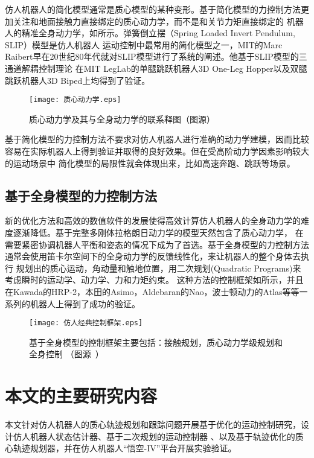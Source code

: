 仿人机器人的简化模型通常是质心模型的某种变形。基于简化模型的力控制方法更加关注和地面接触力直接绑定的质心动力学，而不是和关节力矩直接绑定的
机器人的精准全身动力学\cite{vukobratovic1972contribution}，如所示。弹簧倒立摆（Spring Loaded Invert Pendulum, SLIP）模型是仿人机器人
运动控制中最常用的简化模型之一，MIT的Marc Raibert早在20世纪80年代就对SLIP模型进行了系统的阐述\cite{raibert1986legged}。他基于SLIP模型的三通道解耦控制理论
在MIT LegLab的单腿跳跃机器人3D One-Leg Hopper以及双腿跳跃机器人3D Biped上均得到了验证。

\begin{figure}[htbp]
    \centering
    \texttt{[image: 质心动力学.eps]}
    \caption{\label{fig:centroid}质心动力学及其与全身动力学的联系释图（图源\cite{carpentier2016center}）}
\end{figure}
基于简化模型的力控制方法不要求对仿人机器人进行准确的动力学建模，因而比较容易在实际机器人上得到验证并取得的良好效果。但在受高阶动力学因素影响较大的运动场景中
简化模型的局限性就会体现出来，比如高速奔跑、跳跃等场景。
\subsection{基于全身模型的力控制方法}
新的优化方法和高效的数值软件的发展使得高效计算仿人机器人的全身动力学的难度逐渐降低。基于完整多刚体拉格朗日动力学的模型天然包含了质心动力学\cite{orin2013centroidal}，
在需要紧密协调机器人平衡和姿态的情况下成为了首选。基于全身模型的力控制方法通常会使用笛卡尔空间下的全身动力学的反馈线性化\cite{wieber2000constrained}，来让机器人的整个身体去执行
规划出的质心运动，角动量和触地位置，用二次规划(Quadratic Programs)来考虑瞬时的运动学、动力学、力和力矩约束\cite{wieber2000constrained, kuindersma2014efficiently}。
这种方法的控制框架如所示，并且在Kawada的HRP-2\cite{takenaka2009real}，本田的Asimo\cite{takenaka2009real}，Aldebaran的Nao\cite{gouaillier2010omni}，波士顿动力的Atlas\cite{Kuindersma2020Recent}等等一系列的机器人上得到了成功的验证。
\begin{figure}[htbp]
    \centering
    \texttt{[image: 仿人经典控制框架.eps]}
    \caption{\label{fig:typical_control}基于全身模型的控制框架主要包括：接触规划，质心动力学级规划和全身控制
                （图源~\cite{carpentier2016center}）}
\end{figure}
\section{本文的主要研究内容}
本文针对仿人机器人的质心轨迹规划和跟踪问题开展基于优化的运动控制研究，设计仿人机器人状态估计器、基于二次规划的运动控制器
、以及基于轨迹优化的质心轨迹规划器，并在仿人机器人“悟空-IV”平台开展实验验证。

